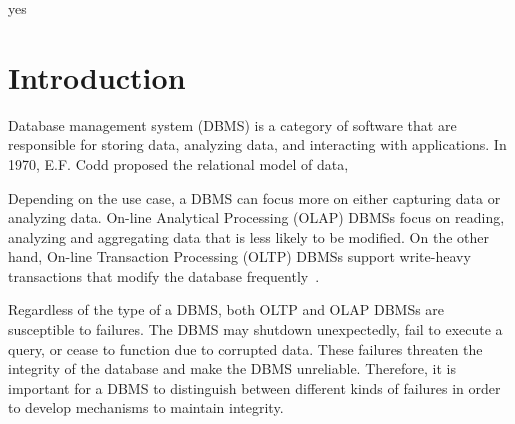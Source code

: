 \documentclass[12pt]{cmuthesis}
\begin{document}
\begin{acknowledgments}
yes
\end{acknowledgments}



\tableofcontents
\listoffigures
\listoftables

\mainmatter


%
%
%
%
%


\chapter{Introduction}
Database management system (DBMS) is a category of software that are responsible for storing data, analyzing data, and interacting with applications. In 1970, E.F. Codd proposed the relational model of data, 

Depending on the use case, a DBMS can focus more on either capturing data or analyzing data. On-line Analytical Processing (OLAP) DBMSs focus on reading, analyzing and aggregating data that is less likely to be modified. On the other hand, On-line Transaction Processing (OLTP) DBMSs support write-heavy transactions that modify the database frequently~\cite{conn05}.

Regardless of the type of a DBMS, both OLTP and OLAP DBMSs are susceptible to failures. The DBMS may shutdown unexpectedly, fail to execute a query, or cease to function due to corrupted data. These failures threaten the integrity of the database and make the DBMS unreliable. Therefore, it is important for a DBMS to distinguish between different kinds of failures in order to develop mechanisms to maintain integrity.
\end{document}
